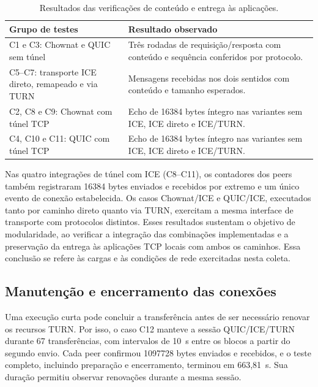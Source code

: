 \begin{table}[htbp]
    \centering
    \small
    \begin{tabular}{@{}p{}p{}@{}}
        \toprule
        \textbf{Grupo de testes} & \textbf{Resultado observado} \\
        \midrule
        C1 e C3: Chownat e QUIC sem túnel & Três rodadas de requisição/resposta com conteúdo e sequência conferidos por protocolo. \\
        C5--C7: transporte ICE direto, remapeado e via TURN & Mensagens recebidas nos dois sentidos com conteúdo e tamanho esperados. \\
        C2, C8 e C9: Chownat com túnel TCP & Echo de 16384 bytes íntegro nas variantes sem ICE, ICE direto e ICE/TURN. \\
        C4, C10 e C11: QUIC com túnel TCP & Echo de 16384 bytes íntegro nas variantes sem ICE, ICE direto e ICE/TURN. \\
        \bottomrule
    \end{tabular}
    \caption{Resultados das verificações de conteúdo e entrega às aplicações.}
    \label{tab:functional_transfer}
\end{table}

Nas quatro integrações de túnel com ICE (C8--C11), os contadores dos peers também registraram 16384 bytes enviados e recebidos por extremo e um único evento de conexão estabelecida. Os casos Chownat/ICE e QUIC/ICE, executados tanto por caminho direto quanto via TURN, exercitam a mesma interface de transporte com protocolos distintos. Esses resultados sustentam o objetivo de modularidade, ao verificar a integração das combinações implementadas e a preservação da entrega às aplicações TCP locais com ambos os caminhos. Essa conclusão se refere às cargas e às condições de rede exercitadas nesta coleta.

\subsection{Manutenção e encerramento das conexões}
\label{sec:functional_maintenance_shutdown}

Uma execução curta pode concluir a transferência antes de ser necessário renovar os recursos TURN. Por isso, o caso C12 manteve a sessão QUIC/ICE/TURN durante 67 transferências, com intervalos de 10~s entre os blocos a partir do segundo envio. Cada peer confirmou 1097728 bytes enviados e recebidos, e o teste completo, incluindo preparação e encerramento, terminou em 663,81~s. Sua duração permitiu observar renovações durante a mesma sessão.

